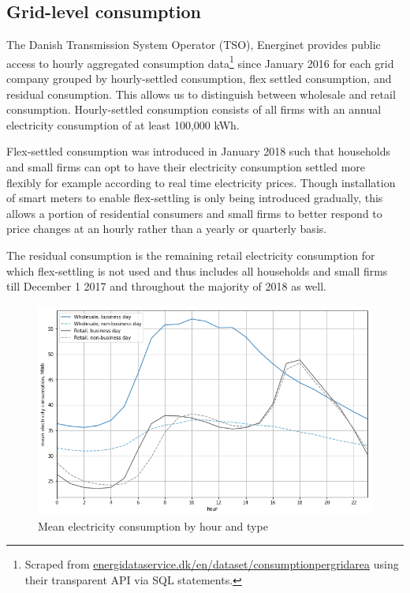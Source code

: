 \subsection{Grid-level consumption}
\label{subsec:d_consumption}
The Danish Transmission System Operator (TSO), Energinet provides public access to hourly aggregated consumption data\footnote{Scraped from \href{https://www.energidataservice.dk/en/dataset/consumptionpergridarea/}{energidataservice.dk/en/dataset/consumptionpergridarea} using their transparent API via SQL statements.} since January 2016 for each grid company grouped by hourly-settled consumption, flex settled consumption, and residual consumption. This allows us to distinguish between wholesale and retail consumption. Hourly-settled consumption consists of all firms with an annual electricity consumption of at least 100,000 kWh.
\par
Flex-settled consumption was introduced in January 2018 such that households and small firms can opt to have their electricity consumption settled more flexibly for example according to real time electricity prices. Though installation of smart meters to enable flex-settling is only being introduced gradually, this allows a portion of residential consumers and small firms to better respond to price changes at an hourly rather than a yearly or quarterly basis.
\par
The residual consumption is the remaining retail electricity consumption for which flex-settling is not used and thus includes all households and small firms till December 1 2017 and throughout the majority of 2018 as well.
\begin{figure}[H]
  \centering
  \caption{Mean electricity consumption by hour and type}
    \label{fig:cons_hours}
  \includegraphics[width=1 \textwidth]{03_figures/cons_hours}
\end{figure}

